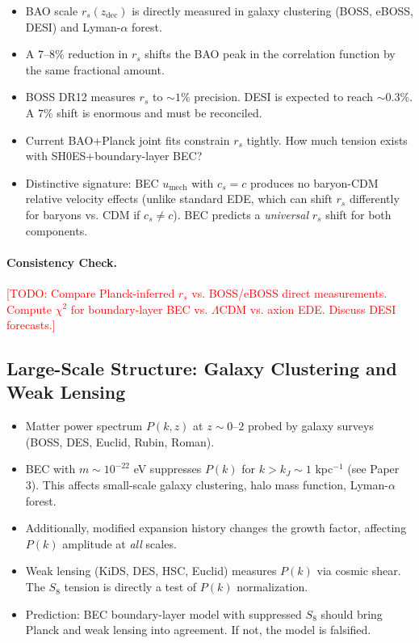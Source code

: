 \documentclass[11pt,a4paper]{article}
\newcommand{\umech}{\ensuremath{u_{\mathrm{mech}}}}
\newcommand{\zdec}{\ensuremath{z_{\mathrm{dec}}}}
\newcommand{\rs}{\ensuremath{r_s}}
\theoremstyle{definition}
\theoremstyle{remark}
\begin{document}
\begin{itemize}[leftmargin=*, itemsep=0.3em]
\item BAO scale $r_s(\zdec)$ is directly measured in galaxy clustering (BOSS, eBOSS, DESI) and Lyman-$\alpha$ forest.
\item A $7$--$8\%$ reduction in $\rs$ shifts the BAO peak in the correlation function by the same fractional amount.
\item BOSS DR12 measures $r_s$ to $\sim 1\%$ precision. DESI is expected to reach $\sim 0.3\%$. A $7\%$ shift is enormous and must be reconciled.
\item Current BAO+Planck joint fits constrain $\rs$ tightly. How much tension exists with SH0ES+boundary-layer BEC?
\item Distinctive signature: BEC $\umech$ with $c_s = c$ produces no baryon-CDM relative velocity effects (unlike standard EDE, which can shift $r_s$ differently for baryons vs. CDM if $c_s \neq c$). BEC predicts a \emph{universal} $r_s$ shift for both components.
\end{itemize}

\paragraph{Consistency Check.}
\textcolor{red}{[TODO: Compare Planck-inferred $r_s$ vs. BOSS/eBOSS direct measurements. Compute $\chi^2$ for boundary-layer BEC vs. $\Lambda$CDM vs. axion EDE. Discuss DESI forecasts.]}

\subsection{Large-Scale Structure: Galaxy Clustering and Weak Lensing}
\label{sec:lss}

\begin{itemize}[leftmargin=*, itemsep=0.3em]
\item Matter power spectrum $P(k,z)$ at $z \sim 0$--$2$ probed by galaxy surveys (BOSS, DES, Euclid, Rubin, Roman).
\item BEC with $m \sim 10^{-22}$ eV suppresses $P(k)$ for $k > k_J \sim 1$ kpc$^{-1}$ (see Paper 3). This affects small-scale galaxy clustering, halo mass function, Lyman-$\alpha$ forest.
\item Additionally, modified expansion history changes the growth factor, affecting $P(k)$ amplitude at \emph{all} scales.
\item Weak lensing (KiDS, DES, HSC, Euclid) measures $P(k)$ via cosmic shear. The $S_8$ tension is directly a test of $P(k)$ normalization.
\item Prediction: BEC boundary-layer model with suppressed $S_8$ should bring Planck and weak lensing into agreement. If not, the model is falsified.
\end{itemize}
\end{document}
